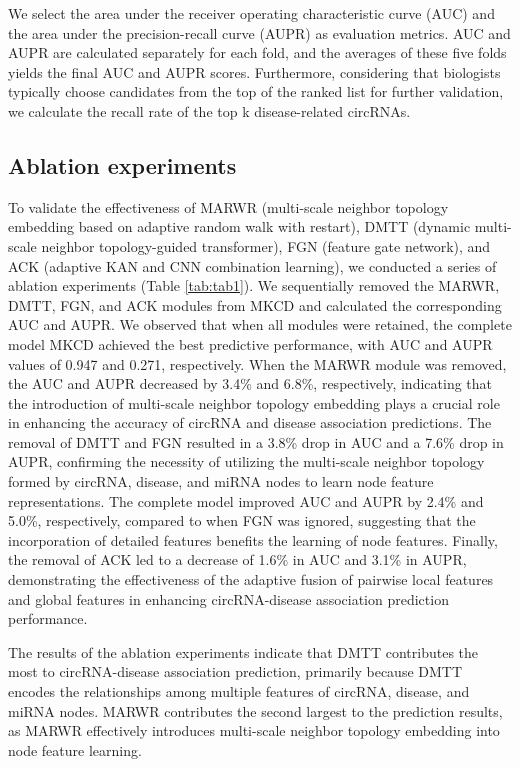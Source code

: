 \documentclass[journal=jcisd8,manuscript=article]{achemso}
\begin{document}
We select the area under the receiver operating characteristic curve (AUC) \cite{hajian2013receiver} and the area under the precision-recall curve (AUPR) \cite{saito2015precision} as evaluation metrics. AUC and AUPR are calculated separately for each fold, and the averages of these five folds yields the final AUC and AUPR scores. Furthermore, considering that biologists typically choose candidates from the top of the ranked list for further validation, we calculate the recall rate of the top k disease-related circRNAs.
\vspace{-0.5cm}

\subsection{Ablation experiments}
\vspace{-0.3cm}
To validate the effectiveness of MARWR (multi-scale neighbor topology embedding based on adaptive random walk with restart), DMTT (dynamic multi-scale neighbor topology-guided transformer), FGN (feature gate network), and ACK (adaptive KAN and CNN combination learning), we conducted a series of ablation experiments (Table \ref{tab:tab1}). We sequentially removed the MARWR, DMTT, FGN, and ACK modules from MKCD and calculated the corresponding AUC and AUPR. We observed that when all modules were retained, the complete model MKCD achieved the best predictive performance, with AUC and AUPR values of 0.947 and 0.271, respectively. When the MARWR module was removed, the AUC and AUPR decreased by 3.4\% and 6.8\%, respectively, indicating that the introduction of multi-scale neighbor topology embedding plays a crucial role in enhancing the accuracy of circRNA and disease association predictions. The removal of DMTT and FGN resulted in a 3.8\% drop in AUC and a 7.6\% drop in AUPR, confirming the necessity of utilizing the multi-scale neighbor topology formed by circRNA, disease, and miRNA nodes to learn node feature representations. The complete model improved AUC and AUPR by 2.4\% and 5.0\%, respectively, compared to when FGN was ignored, suggesting that the incorporation of detailed features benefits the learning of node features. Finally, the removal of ACK led to a decrease of 1.6\% in AUC and 3.1\% in AUPR, demonstrating the effectiveness of the adaptive fusion of pairwise local features and global features in enhancing circRNA-disease association prediction performance.

The results of the ablation experiments indicate that DMTT contributes the most to circRNA-disease association prediction, primarily because DMTT encodes the relationships among multiple features of circRNA, disease, and miRNA nodes. MARWR contributes the second largest to the prediction results, as MARWR effectively introduces multi-scale neighbor topology embedding into node feature learning.
\end{document}
